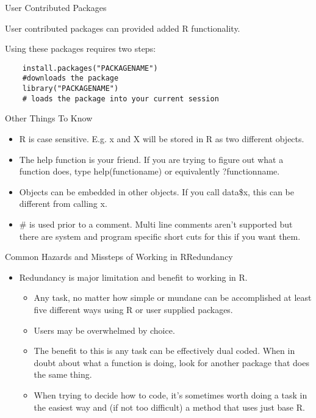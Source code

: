 \documentclass{beamer}
\begin{document}
\begin{frame}[fragile]{User Contributed Packages}
\item User contributed packages can provided added R functionality.  
\item Using these packages requires two steps:
\begin{verbatim}
    install.packages("PACKAGENAME")
    #downloads the package
    library("PACKAGENAME") 
    # loads the package into your current session
\end{verbatim}
\end{frame}
\begin{frame}{Other Things To Know}
\begin{itemize}
    \item R is case sensitive. E.g. x and X will be stored in R as two different objects.
    \item The help function is your friend.  If you are trying to figure out what a function does, type help(functioname) or equivalently ?functionname.
    \item Objects can be embedded in other objects.  If you call data\$x, this can be different from calling x.
   \item \# is used prior to a comment.  Multi line comments aren't supported but there are system and program specific short cuts for this if you want them.
    \end{itemize}
    \end{frame}


\begin{frame}{Common Hazards and Missteps of Working in R}{Redundancy}
\begin{itemize}

    \item Redundancy is major limitation and benefit to working in R.
    \begin{itemize}
        \item Any task, no matter how simple or mundane can be accomplished at least five different ways using R or user supplied packages.
        \item Users may be overwhelmed by choice. 
        \item The benefit to this is any task can be effectively dual coded.  When in doubt about what a function is doing, look for another package that does the same thing.
        \item When trying to decide how to code, it's sometimes worth doing a task in the easiest way and (if not too difficult) a method that uses just base R.  
    \end{itemize}
\end{itemize}
\end{frame}
\end{document}

